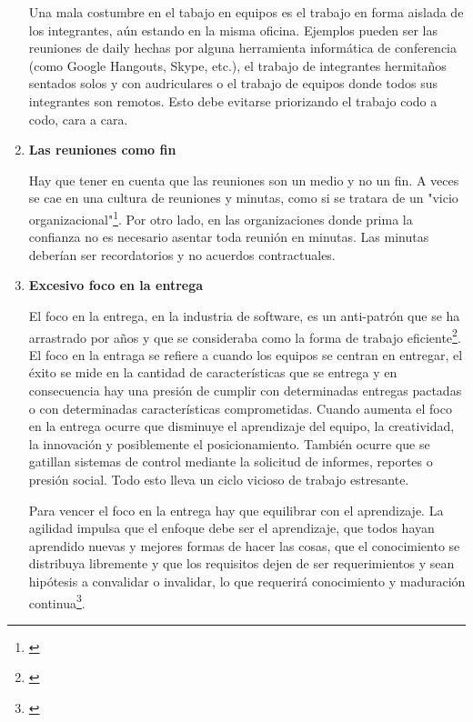 \begin{enumerate}
Una mala costumbre en el tabajo en equipos es el trabajo en forma aislada de los integrantes, aún estando en la misma oficina. Ejemplos pueden ser las reuniones de daily hechas por alguna herramienta informática de conferencia (como Google Hangouts, Skype, etc.), el trabajo de integrantes hermitaños sentados solos y con audriculares o el trabajo de equipos donde todos sus integrantes son remotos. Esto debe evitarse priorizando el trabajo codo a codo, cara a cara.

\item \textbf{Las reuniones como fin}

Hay que tener en cuenta que las reuniones son un medio y no un fin. A veces se cae en una cultura de reuniones y minutas, como si se tratara de un "vicio organizacional"\footnote{\cite{UNTREF-2014}}. Por otro lado, en las organizaciones donde prima la confianza no es necesario asentar toda reunión en minutas. Las minutas deberían ser recordatorios y no acuerdos contractuales.

\item \textbf{Excesivo foco en la entrega}

El foco en la entrega, en la industria de software, es un anti-patrón que se ha arrastrado por años y que se consideraba como la forma de trabajo eficiente\footnote{\cite{Erich-Buhler-2015}}. El foco en la entraga se refiere a cuando los equipos se centran en entregar, el éxito se mide en la cantidad de características que se entrega y en consecuencia hay una presión de cumplir con determinadas entregas pactadas o con determinadas características comprometidas. Cuando aumenta el foco en la entrega ocurre que disminuye el aprendizaje del equipo, la creatividad, la innovación y posiblemente el posicionamiento. También ocurre que se gatillan sistemas de control mediante la solicitud de informes, reportes o presión social. Todo esto lleva un ciclo vicioso de trabajo estresante.

Para vencer el foco en la entrega hay que equilibrar con el aprendizaje. La agilidad impulsa que el enfoque debe ser el aprendizaje, que todos hayan aprendido nuevas y mejores formas de hacer las cosas, que el conocimiento se distribuya libremente y que los requisitos dejen de ser requerimientos y sean hipótesis a convalidar o invalidar, lo que requerirá conocimiento y maduración continua\footnote{\cite{Erich-Buhler-2015}}.

\end{enumerate}
